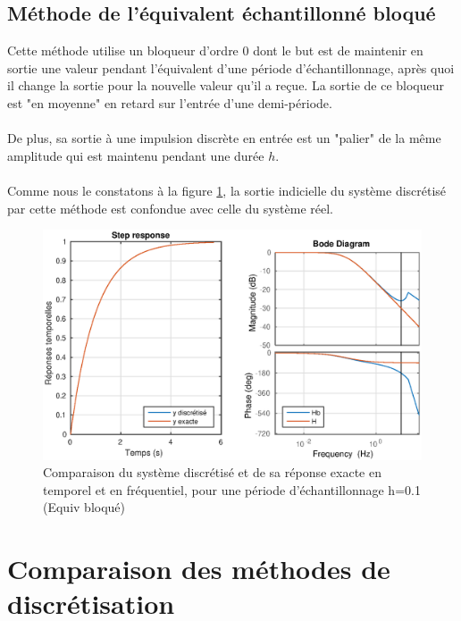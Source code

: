 \subsection{Méthode de l'équivalent échantillonné bloqué}

Cette méthode utilise un bloqueur d'ordre 0 dont le but est de maintenir en sortie une valeur pendant l'équivalent d'une période d'échantillonnage, après quoi il change la sortie pour la nouvelle valeur qu'il a reçue. La sortie de ce bloqueur est "en moyenne" en retard sur l'entrée d'une demi-période.
\paragraph{}
De plus, sa sortie à une impulsion discrète en entrée est un "palier" de la même amplitude qui est maintenu pendant une durée $h$.

\paragraph{}
Comme nous le constatons à la figure \ref{labo1-bloque-step}, la sortie indicielle du système discrétisé par cette méthode est confondue avec celle du système réel.

\begin{figure}[!h]
\center\includegraphics[width=1\linewidth]{eps/labo1-bloque-step}
\caption{Comparaison du système discrétisé et de sa réponse exacte en temporel et en fréquentiel, pour une période d'échantillonnage h=0.1 (Equiv bloqué)}
\label{labo1-bloque-step}
\end{figure}


\section{Comparaison des méthodes de discrétisation}\label{labo1-comparaison}

